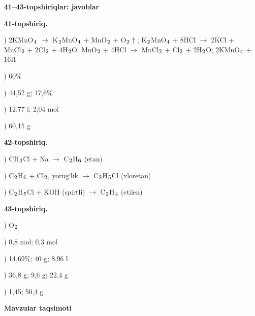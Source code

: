 \documentclass[11pt,a4paper]{article}
\renewcommand{\textsubscript}[1]{\ensuremath{_{\text{\fontsize{8}{8}\selectfont #1}}}}
\begin{document}
\noindent\textbf{41--43-topshiriqlar: javoblar}\par\smallskip
\noindent\textbf{41-topshiriq.}\par
{}) 2KMnO\textsubscript{4} $\to$ K\textsubscript{2}MnO\textsubscript{4} + MnO\textsubscript{2} + O\textsubscript{2}$\uparrow$; K\textsubscript{2}MnO\textsubscript{4} + 8HCl $\to$ 2KCl + MnCl\textsubscript{2} + 2Cl\textsubscript{2} + 4H\textsubscript{2}O; MnO\textsubscript{2} + 4HCl $\to$ MnCl\textsubscript{2} + Cl\textsubscript{2} + 2H\textsubscript{2}O; 2KMnO\textsubscript{4} + 16H\par
{}) 60\%\par
{}) 44,52 g; 17,6\%\par
{}) 12,77 l; 2,04 mol\par
{}) 60,15 g\par
\noindent\textbf{42-topshiriq.}\par
{}) CH\textsubscript{3}Cl + Na $\to$ C\textsubscript{2}H\textsubscript{6} (etan)\par
{}) C\textsubscript{2}H\textsubscript{6} + Cl\textsubscript{2}, yorug`lik $\to$ C\textsubscript{2}H\textsubscript{5}Cl (xloretan)\par
{}) C\textsubscript{2}H\textsubscript{5}Cl + KOH (spirtli) $\to$ C\textsubscript{2}H\textsubscript{4} (etilen)\par
\noindent\textbf{43-topshiriq.}\par
{}) O\textsubscript{2}\par
{}) 0,8 mol; 0,3 mol\par
{}) 14,69\%; 40 g; 8,96 l\par
{}) 36,8 g; 9,6 g; 22,4 g\par
{}) 1,45; 50,4 g\par
\par\bigskip\noindent\textbf{Mavzular taqsimoti}\par\smallskip
\end{document}
